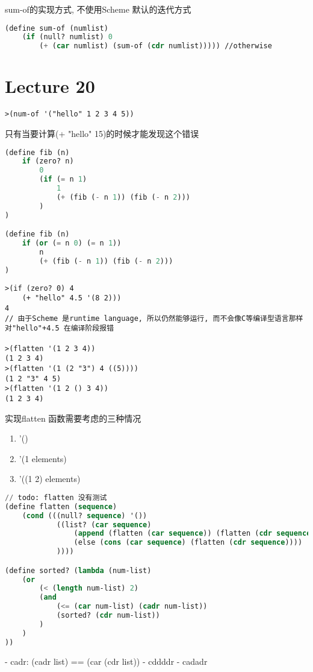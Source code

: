 \documentclass{article}
\begin{document}
sum-of的实现方式, 不使用Scheme 默认的迭代方式
\begin{lstlisting}[language = Lisp]
(define sum-of (numlist)
	(if (null? numlist) 0
		(+ (car numlist) (sum-of (cdr numlist))))) //otherwise
\end{lstlisting}

\section{Lecture 20}
\begin{verbatim}
>(num-of '("hello" 1 2 3 4 5))
\end{verbatim}
只有当要计算(+ "hello" 15)的时候才能发现这个错误

\begin{lstlisting}[language = Lisp]
(define fib (n)
	if (zero? n)
		0
		(if (= n 1)
			1
			(+ (fib (- n 1)) (fib (- n 2)))
		)
)

(define fib (n)
	if (or (= n 0) (= n 1))
		n
		(+ (fib (- n 1)) (fib (- n 2)))
)
\end{lstlisting}

\begin{verbatim}
>(if (zero? 0) 4
	(+ "hello" 4.5 '(8 2)))
4
// 由于Scheme 是runtime language, 所以仍然能够运行, 而不会像C等编译型语言那样对"hello"+4.5 在编译阶段报错

>(flatten '(1 2 3 4))
(1 2 3 4)
>(flatten '(1 (2 "3") 4 ((5))))
(1 2 "3" 4 5)
>(flatten '(1 2 () 3 4))
(1 2 3 4)
\end{verbatim}

实现flatten 函数需要考虑的三种情况
\begin{enumerate}
	\item '()
	\item '(1 elements)
	\item '((1 2) elements)
\end{enumerate}

\begin{lstlisting}[language = Lisp]
// todo: flatten 没有测试
(define flatten (sequence)
	(cond (((null? sequence) '())
			((list? (car sequence)
				(append (flatten (car sequence)) (flatten (cdr sequence)))
				(else (cons (car sequence) (flatten (cdr sequence))))
			))))

(define sorted? (lambda (num-list)
	(or
		(< (length num-list) 2)
		(and
			(<= (car num-list) (cadr num-list))
			(sorted? (cdr num-list))
		)
	)
))
\end{lstlisting}

- cadr: (cadr list) == (car (cdr list))
- cddddr
- cadadr
\end{document}
